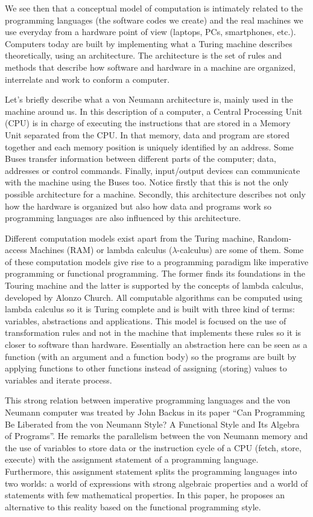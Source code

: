 We see then that a conceptual model of computation is intimately related to the programming languages (the software codes we create) and the real machines we use everyday from a hardware point of view (laptops, PCs, smartphones, etc.). Computers today are built by implementing what a Turing machine describes theoretically, using an architecture. The architecture is the set of rules and methods that describe how software and hardware in a machine are organized, interrelate and work to conform a computer.

Let's briefly describe what a von Neumann architecture is, mainly used in the machine around us. In this description of a computer, a Central Processing Unit (CPU) is in charge of executing the instructions that are stored in a Memory Unit separated from the CPU. In that memory, data and program are stored together and each memory position is uniquely identified by an address. Some Buses transfer information between different parts of the computer; data, addresses or control commands. Finally, input/output devices can communicate with the machine using the Buses too. Notice firstly that this is not the only possible architecture for a machine. Secondly, this architecture describes not only how the hardware is organized but also how data and programs work so programming languages are also influenced by this architecture. 


Different computation models exist apart from the Turing machine, Random-access Machines (RAM) or lambda calculus ($\lambda$-calculus) are some of them. Some of these computation models give rise to a programming paradigm like imperative programming or functional programming. The former finds its foundations in the Touring machine and the latter is supported by the concepts of lambda calculus, developed by Alonzo Church. All computable algorithms can be computed using lambda calculus so it is Turing complete and is built with three kind of terms: variables, abstractions and applications. This model is focused on the use of transformation rules and not in the machine that implements these rules so it is closer to software than hardware. Essentially an abstraction here can be seen as a function (with an argument and a function body) so the programs are built by applying functions to other functions instead of assigning (storing) values to variables and iterate  process. 


This strong relation between imperative programming languages and the von Neumann computer was treated by John Backus in its paper ``Can Programming Be Liberated from the von Neumann Style? A Functional Style and Its Algebra of Programs''. He remarks the parallelism between the von Neumann memory and the use of variables to store data or the instruction cycle of a CPU (fetch, store, execute) with the assignment statement of a programming language. Furthermore, this assignment statement splits the programming languages into two worlds: a world of expressions with strong algebraic properties and a world of statements with few mathematical properties. In this paper, he proposes an alternative to this reality based on the functional programming style. 

